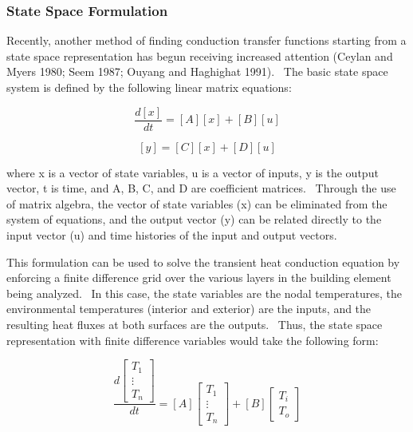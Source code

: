 \subsubsection{State Space Formulation}\label{state-space-formulation}

Recently, another method of finding conduction transfer functions starting from a state space representation has begun receiving increased attention (Ceylan and Myers 1980; Seem 1987; Ouyang and Haghighat 1991).~ The basic state space system is defined by the following linear matrix equations:

\begin{equation}
\frac{{d\left[ x \right]}}{{dt}} = \left[ A \right]\left[ x \right] + \left[ B \right]\left[ u \right]
\end{equation}

\begin{equation}
\left[ y \right] = \left[ C \right]\left[ x \right] + \left[ D \right]\left[ u \right]
\end{equation}

where x is a vector of state variables, u is a vector of inputs, y is the output vector, t is time, and A, B, C, and D are coefficient matrices.~ Through the use of matrix algebra, the vector of state variables (x) can be eliminated from the system of equations, and the output vector (y) can be related directly to the input vector (u) and time histories of the input and output vectors.

This formulation can be used to solve the transient heat conduction equation by enforcing a finite difference grid over the various layers in the building element being analyzed.~ In this case, the state variables are the nodal temperatures, the environmental temperatures (interior and exterior) are the inputs, and the resulting heat fluxes at both surfaces are the outputs.~ Thus, the state space representation with finite difference variables would take the following form:

\begin{equation}
\frac{{d\left[ {\begin{array}{*{20}{c}}{{T_1}}\\ \vdots \\ {{T_n}}\end{array}} \right]}}{{dt}} = \left[ A \right]\left[ {\begin{array}{*{20}{c}}{{T_1}}\\ \vdots \\ {{T_n}}\end{array}} \right] + \left[ B \right]\left[ {\begin{array}{*{20}{c}}{{T_i}}\\ {{T_o}}\end{array}} \right]
\end{equation}

